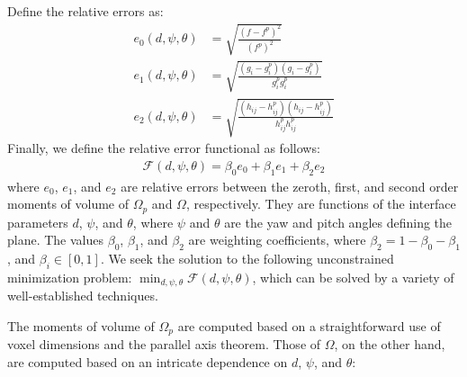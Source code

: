 Define the relative errors as:
\begin{align}
e_0(d,\psi,\theta) &=  \sqrt{\frac{(f - f^p)^2}{(f^p)^2}} \\
e_1(d,\psi,\theta) &=  \sqrt{\frac{(g_i - g_i^p)(g_i - g_i^p)}{g_i^{p}g_i^{p}}} \\
e_2(d,\psi,\theta) &=  \sqrt{\frac{(h_{ij} - h_{ij}^p)(h_{ij} - h_{ij}^p)}{h_{ij}^{p}h_{ij}^{p}}}
\end{align}
Finally, we define the relative error functional as follows:
\begin{align}
\mathcal{F}(d,\psi,\theta) = \beta_0e_0 + \beta_1e_1 + \beta_2e_2
\end{align}
where $e_0$, $e_1$, and $e_2$ are relative errors between the zeroth, first, and second order moments of volume of $\Omega_p$ and $\Omega$, respectively. They are functions of the interface parameters $d$, $\psi$, and $\theta$, where $\psi$ and $\theta$ are the yaw and pitch angles defining the plane. The values $\beta_0$, $\beta_1$, and $\beta_2$ are weighting coefficients, where $\beta_2 = 1 - \beta_0 - \beta_1$, and $\beta_i \in [0, 1]$. We seek the solution to the following unconstrained minimization problem: $\displaystyle \min_{d, \psi, \theta} \mathcal{F}(d,\psi,\theta)$, which can be solved by a variety of well-established techniques.

The moments of volume of $\Omega_p$ are computed based on a straightforward use of voxel dimensions and the parallel axis theorem. Those of $\Omega$, on the other hand, are computed based on an intricate dependence on $d$, $\psi$, and $\theta$:

